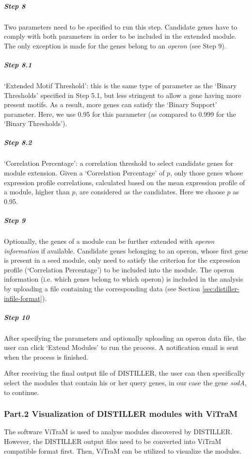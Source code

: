 \begin{small} %

\subparagraph{Step 8} Two parameters need to be specified to run this step. Candidate genes have to comply with both parameters in order to be included in the extended module. The only exception is made for the genes belong to an \textit{operon} (see Step 9). 

\subparagraph{Step 8.1} `Extended Motif Threshold': this is the same type of parameter as the `Binary Thresholds' specified in Step 5.1, but less stringent to allow a gene having more present motifs. As a result, more genes can satisfy the `Binary Support' parameter.  Here, we use 0.95 for this parameter (as compared to 0.999 for the `Binary Thresholds').

\subparagraph{Step 8.2}	`Correlation Percentage': a correlation threshold to select candidate genes for module extension.  Given a `Correlation Percentage' of $p$, only those genes whose expression profile correlations, calculated based on the mean expression profile of a module, higher than $p$, are considered as the candidates. Here we choose $p$ as 0.95.


\subparagraph{Step 9} Optionally, the genes of a module can be further extended with \textit{operon information} if available.  Candidate genes belonging to an operon, whose first gene is present in a seed module, only need to satisfy the criterion for the expression profile (`Correlation Percentage') to be included into the module.  The operon information (i.e. which genes belong to which operon) is included in the analysis by uploading a file containing the corresponding data (see Section \ref{sec:distiller-infile-format}). 

\subparagraph{Step 10} After specifying the parameters and optionally uploading an operon data file, the user can click `Extend Modules' to run the process.  A notification email is sent when the process is finished.

\end{small} %

After receiving the final output file of DISTILLER, the user can then specifically select the modules that contain his or her query genes, in our case the gene \textit{sodA}, to continue.





\subsubsection{Part.2 Visualization of DISTILLER modules with ViTraM}
The software ViTraM is used to analyse modules discovered by DISTILLER. However, the DISTILLER output files need to be converted into ViTraM compatible format first.  Then, ViTraM can be utilized to visualize the modules.

